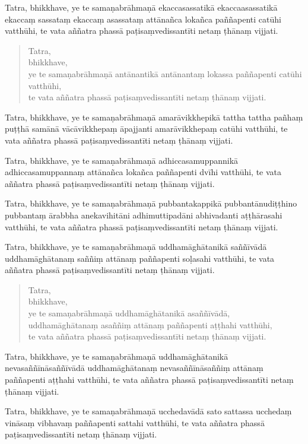 \documentclass[11pt,twoside,openright]{book}
\begin{document}
\pstart
Tatra, bhikkhave, ye te samaṇabrāhmaṇā ekaccasassatikā ekaccaasassatikā ekaccaṃ sassataṃ ekaccaṃ asassataṃ attānañca lokañca paññapenti catūhi vatthūhi, te vata aññatra phassā paṭisaṃvedissantīti netaṃ ṭhānaṃ vijjati.
\pend

\begin{verse}
Tatra,\\
\vin  bhikkhave,\\
\vin  ye te samaṇabrāhmaṇā antānantikā antānantaṃ lokassa paññapenti catūhi vatthūhi,\\
\vin  te vata aññatra phassā paṭisaṃvedissantīti netaṃ ṭhānaṃ vijjati.

\end{verse}
\pstart
Tatra, bhikkhave, ye te samaṇabrāhmaṇā amarāvikkhepikā tattha tattha pañhaṃ puṭṭhā samānā vācāvikkhepaṃ āpajjanti amarāvikkhepaṃ catūhi vatthūhi, te vata aññatra phassā paṭisaṃvedissantīti netaṃ ṭhānaṃ vijjati.
\pend

\pstart
Tatra, bhikkhave, ye te samaṇabrāhmaṇā adhiccasamuppannikā adhiccasamuppannaṃ attānañca lokañca paññapenti dvīhi vatthūhi, te vata aññatra phassā paṭisaṃvedissantīti netaṃ ṭhānaṃ vijjati.
\pend

\pstart
Tatra, bhikkhave, ye te samaṇabrāhmaṇā pubbantakappikā pubbantānudiṭṭhino pubbantaṃ ārabbha anekavihitāni adhimuttipadāni abhivadanti aṭṭhārasahi vatthūhi, te vata aññatra phassā paṭisaṃvedissantīti netaṃ ṭhānaṃ vijjati.
\pend

\pstart
Tatra, bhikkhave, ye te samaṇabrāhmaṇā uddhamāghātanikā saññīvādā uddhamāghātanaṃ saññiṃ attānaṃ paññapenti soḷasahi vatthūhi, te vata aññatra phassā paṭisaṃvedissantīti netaṃ ṭhānaṃ vijjati.
\pend

\begin{verse}
Tatra,\\
\vin  bhikkhave,\\
\vin  ye te samaṇabrāhmaṇā uddhamāghātanikā asaññīvādā,\\
\vin  uddhamāghātanaṃ asaññiṃ attānaṃ paññapenti aṭṭhahi vatthūhi,\\
\vin  te vata aññatra phassā paṭisaṃvedissantīti netaṃ ṭhānaṃ vijjati.

\end{verse}
\pstart
Tatra, bhikkhave, ye te samaṇabrāhmaṇā uddhamāghātanikā nevasaññīnāsaññīvādā uddhamāghātanaṃ nevasaññīnāsaññiṃ attānaṃ paññapenti aṭṭhahi vatthūhi, te vata aññatra phassā paṭisaṃvedissantīti netaṃ ṭhānaṃ vijjati.
\pend

\pstart
Tatra, bhikkhave, ye te samaṇabrāhmaṇā ucchedavādā sato sattassa ucchedaṃ vināsaṃ vibhavaṃ paññapenti sattahi vatthūhi, te vata aññatra phassā paṭisaṃvedissantīti netaṃ ṭhānaṃ vijjati.
\pend
\end{document}
